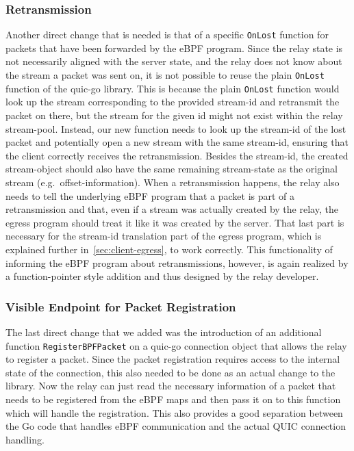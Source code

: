 \subsubsection*{Retransmission}
Another direct change that is needed is that of a specific \verb|OnLost| function for packets that 
have been forwarded by the eBPF program.
Since the relay state is not necessarily aligned with the server state, and the relay does not know
about the stream a packet was sent on, it is not possible to reuse the plain \verb|OnLost| function
of the quic-go library.
This is because the plain \verb|OnLost| function would look up the stream corresponding to the provided stream-id and 
retransmit the packet on there, but the stream for the given id might not exist within the relay stream-pool.
Instead, our new function needs to look up the stream-id of the lost packet and potentially open a new stream with
the same stream-id, ensuring that the client correctly receives the retransmission.
Besides the stream-id, the created stream-object should also have the same remaining stream-state
as the original stream (e.g.~offset-information).  
When a retransmission happens, the relay also needs to tell the underlying eBPF program that a packet is part of a 
retransmission and that, even if a stream was actually created by the relay, the egress program should treat it like 
it was created by the server.
That last part is necessary for the stream-id translation part of the egress program, which is explained further
in~\autoref{sec:client-egress}, to work correctly.
This functionality of informing the eBPF program about retransmissions, however, is again realized by a 
function-pointer style addition and thus designed by the relay developer.

\subsubsection*{Visible Endpoint for Packet Registration}
The last direct change that we added was the introduction of an additional function \verb|RegisterBPFPacket| 
on a quic-go connection object that allows the relay to register a packet.
Since the packet registration requires access to the internal state of the connection, this also needed to be 
done as an actual change to the library.
Now the relay can just read the necessary information of a packet that needs to be registered
from the eBPF maps and then pass it on to this function which will handle the registration.
This also provides a good separation between the Go code that handles eBPF communication and the actual
QUIC connection handling.